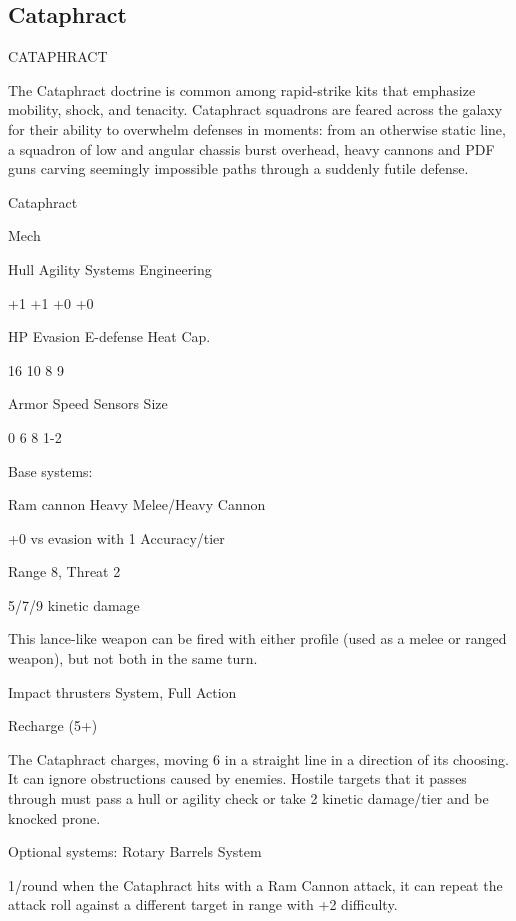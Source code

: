 \subsection{Cataphract}
                                            CATAPHRACT  

The Cataphract doctrine is common among rapid-strike kits that emphasize mobility, shock, and  
tenacity. Cataphract squadrons are feared across the galaxy for their ability to overwhelm  
defenses in moments: from an otherwise static line, a squadron of low and angular chassis burst  
overhead, heavy cannons and PDF guns carving seemingly impossible paths through a suddenly  
futile defense. 
 

 Cataphract 

 Mech 

 Hull       Agility      Systems       Engineering 

 +1         +1           +0            +0 

 HP         Evasion      E-defense     Heat Cap. 

 16         10           8             9 

 Armor      Speed        Sensors       Size 

 0          6            8             1-2 

Base systems:
 
Ram cannon  
Heavy Melee/Heavy Cannon
 
+0 vs evasion with 1 Accuracy/tier
 
Range 8, Threat 2
 
5/7/9 kinetic damage
 
This lance-like weapon can be fired with either profile (used as a melee or ranged weapon), but  
not both in the same turn.
 

Impact thrusters  
System, Full Action
 
Recharge (5+)
 
The Cataphract charges, moving 6 in a straight line in a direction of its choosing. It can ignore  
obstructions caused by enemies. Hostile targets that it passes through must pass a hull or agility  
check or take 2 kinetic damage/tier and be knocked prone.
 

Optional systems:  
Rotary Barrels  
System
 
1/round when the Cataphract hits with a Ram Cannon attack, it can repeat the attack roll against  
a different target in range with +2 difficulty.
 


